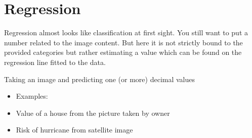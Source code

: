 \documentclass[letterpaper,10pt,english]{sphinxmanual}
\begin{document}
\begin{sphinxVerbatim}[commandchars=\\\{\}]
    
      
       
     
\end{sphinxVerbatim}

\noindent{}


\section{Regression}
\label{\detokenize{03-Datasets:regression}}
\sphinxAtStartPar
Regression almost looks like classification at first sight. You still want to put a number related to the image content. But here it is not strictly bound to the provided categories but rather estimating a value which can be found on the regression line fitted to the data.

\sphinxAtStartPar
Taking an image and predicting one (or more) decimal values
\begin{itemize}
\item {} 
\sphinxAtStartPar
Examples:

\item {} 
\sphinxAtStartPar
Value of a house from the picture taken by owner

\item {} 
\sphinxAtStartPar
Risk of hurricane from satellite image

\end{itemize}
\end{document}
